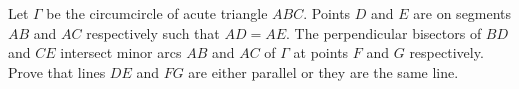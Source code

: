 Let $\Gamma$ be the circumcircle of acute triangle $ABC$. Points $D$ and $E$ are on segments $AB$ and $AC$ respectively such that $AD = AE$. The perpendicular bisectors of $BD$ and $CE$ intersect minor arcs $AB$ and $AC$ of $\Gamma$ at points $F$ and $G$ respectively. Prove that lines $DE$ and $FG$ are either parallel or they are the same line.